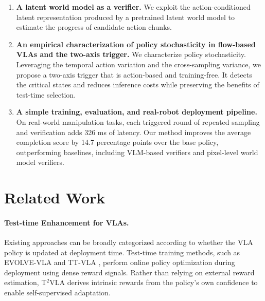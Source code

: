 \documentclass[10pt,twocolumn,letterpaper]{article}
\begin{document}
\begin{enumerate}

\item \textbf{A latent world model as a verifier.} We exploit the action-conditioned latent representation produced by a pretrained latent world model to estimate the progress of candidate action chunks.

\item \textbf{An empirical characterization of policy stochasticity in flow-based VLAs and the two-axis trigger.} We characterize policy stochasticity. Leveraging the temporal action variation and the cross-sampling variance, we propose a two-axis trigger that is action-based and training-free. It detects the critical states and reduces inference costs while preserving the benefits of test-time selection.

\item \textbf{A simple training, evaluation, and real-robot deployment pipeline.} On real-world manipulation tasks, each triggered round of repeated sampling and verification adds 326 ms of latency. Our method improves the average completion score by 14.7 percentage points over the base policy, outperforming baselines, including VLM-based verifiers and pixel-level world model verifiers.

\end{enumerate}
\section{Related Work}

\paragraph{Test-time Enhancement for VLAs.}
Existing approaches can be broadly categorized according to whether the VLA policy is updated at deployment time.
Test-time training methods, such as EVOLVE-VLA \cite{bai2025evolvevlatesttimetrainingenvironment} and TT-VLA \cite{liu2026ontheflyvlaadaptationtesttime}, perform online policy optimization during deployment using dense reward signals. Rather than relying on external reward estimation, T$^2$VLA \cite{chen2026trustinstinctsconfidencedriventesttime} derives intrinsic rewards from the policy's own confidence to enable self-supervised adaptation.
\end{document}
